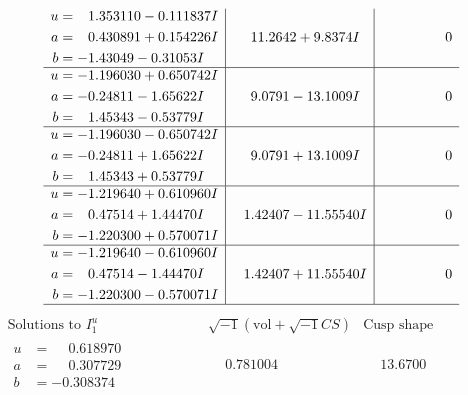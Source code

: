\documentclass[1p]{elsarticle_modified}
\theoremstyle{definition}
\newcommand{\I}{\sqrt{-1}}
\begin{document}
$$\begin{array}{c|c|c}
\begin{aligned}
u &= \phantom{-}1.353110 - 0.111837 I \\
a &= \phantom{-}0.430891 + 0.154226 I \\
b &= -1.43049 - 0.31053 I\end{aligned}
 & \phantom{-}11.2642 + 9.8374 I & \phantom{-0.000000 } 0 \\ \hline\begin{aligned}
u &= -1.196030 + 0.650742 I \\
a &= -0.24811 - 1.65622 I \\
b &= \phantom{-}1.45343 - 0.53779 I\end{aligned}
 & \phantom{-}9.0791 - 13.1009 I & \phantom{-0.000000 } 0 \\ \hline\begin{aligned}
u &= -1.196030 - 0.650742 I \\
a &= -0.24811 + 1.65622 I \\
b &= \phantom{-}1.45343 + 0.53779 I\end{aligned}
 & \phantom{-}9.0791 + 13.1009 I & \phantom{-0.000000 } 0 \\ \hline\begin{aligned}
u &= -1.219640 + 0.610960 I \\
a &= \phantom{-}0.47514 + 1.44470 I \\
b &= -1.220300 + 0.570071 I\end{aligned}
 & \phantom{-}1.42407 - 11.55540 I & \phantom{-0.000000 } 0 \\ \hline\begin{aligned}
u &= -1.219640 - 0.610960 I \\
a &= \phantom{-}0.47514 - 1.44470 I \\
b &= -1.220300 - 0.570071 I\end{aligned}
 & \phantom{-}1.42407 + 11.55540 I & \phantom{-0.000000 } 0\\
 \hline 
 \end{array}$$\newpage$$\begin{array}{c|c|c}  
\text{Solutions to }I^u_{1}& \I (\text{vol} + \sqrt{-1}CS) & \text{Cusp shape}\\
 \hline 
\begin{aligned}
u &= \phantom{-}0.618970\phantom{ +0.000000I} \\
a &= \phantom{-}0.307729\phantom{ +0.000000I} \\
b &= -0.308374\phantom{ +0.000000I}\end{aligned}
 & \phantom{-}0.781004\phantom{ +0.000000I} & \phantom{-}13.6700\phantom{ +0.000000I} \\ \hline\begin{aligned}

\end{aligned}
\end{array}$$
\end{document}
